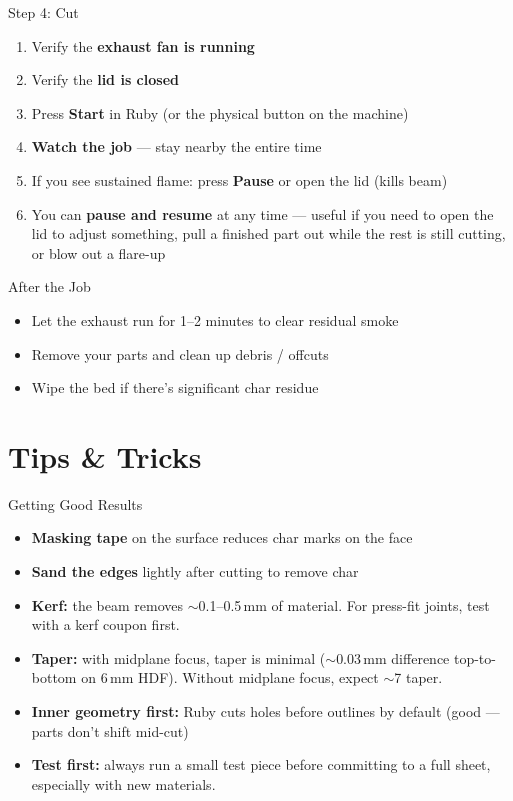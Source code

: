 \documentclass[aspectratio=169]{beamer}
\begin{document}
\begin{frame}{Step 4: Cut}
\begin{enumerate}
    \item Verify the \textbf{exhaust fan is running}
    \item Verify the \textbf{lid is closed}
    \item Press \textbf{Start} in Ruby (or the physical button on the machine)
    \item \textbf{Watch the job} --- stay nearby the entire time
    \item If you see sustained flame: press \textbf{Pause} or open the lid (kills beam)
    \item You can \textbf{pause and resume} at any time --- useful if you need to
        open the lid to adjust something, pull a finished part out while
        the rest is still cutting, or blow out a flare-up
\end{enumerate}

\vspace{1em}
\begin{block}{After the Job}
\begin{itemize}
    \item Let the exhaust run for 1--2 minutes to clear residual smoke
    \item Remove your parts and clean up debris / offcuts
    \item Wipe the bed if there's significant char residue
\end{itemize}
\end{block}
\end{frame}

\section{Tips \& Tricks}

\begin{frame}{Getting Good Results}
\begin{itemize}
    \item \textbf{Masking tape} on the surface reduces char marks on the face
    \item \textbf{Sand the edges} lightly after cutting to remove char
    \item \textbf{Kerf:} the beam removes $\sim$0.1--0.5\,mm of material.
        For press-fit joints, test with a kerf coupon first.
    \item \textbf{Taper:} with midplane focus, taper is minimal
        ($\sim$0.03\,mm difference top-to-bottom on 6\,mm HDF).
        Without midplane focus, expect $\sim$7\textdegree{} taper.
    \item \textbf{Inner geometry first:} Ruby cuts holes before outlines by default
        (good --- parts don't shift mid-cut)
    \item \textbf{Test first:} always run a small test piece before committing
        to a full sheet, especially with new materials.
\end{itemize}
\end{frame}
\end{document}
